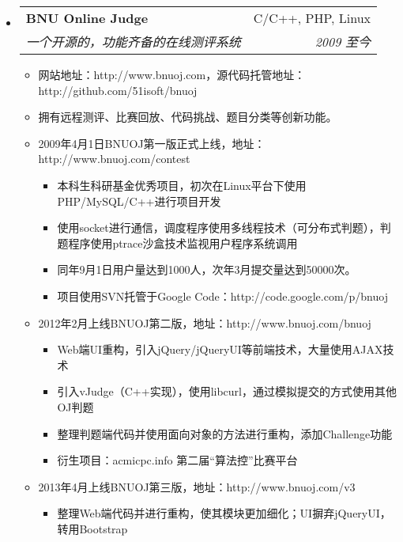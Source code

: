 \documentclass[letterpaper,11pt,UTF8,nofonts]{ctexart}
\makeatletter
\newcommand{\resitem}[1]{\item #1 \vspace{-2pt}}
\newcommand{\ressubheading}[4]{

\begin{tabular*}{6.5in}{l@{\cftdotfill{\cftsecdotsep}\extracolsep{\fill}}r}

		\textbf{#1} & #2 \\

		\textit{#3} & \textit{#4} \\

\end{tabular*}\vspace{-6pt}}
\makeatother
\begin{document}
\begin{itemize}

\item \ressubheading{BNU Online Judge}{C/C++, PHP, Linux}{一个开源的，功能齐备的在线测评系统}{2009 至今}

  \begin{itemize}

    \resitem{网站地址：http://www.bnuoj.com，源代码托管地址：http://github.com/51isoft/bnuoj}
    
    \resitem{拥有远程测评、比赛回放、代码挑战、题目分类等创新功能。}

    \resitem{2009年4月1日BNUOJ第一版正式上线，地址：http://www.bnuoj.com/contest}
    
    \begin{itemize}
    
    	\resitem{本科生科研基金优秀项目，初次在Linux平台下使用PHP/MySQL/C++进行项目开发}
    	
    	\resitem{使用socket进行通信，调度程序使用多线程技术（可分布式判题），判题程序使用ptrace沙盒技术监视用户程序系统调用}
    	
    	\resitem{同年9月1日用户量达到1000人，次年3月提交量达到50000次。}
    	
    	\resitem{项目使用SVN托管于Google Code：http://code.google.com/p/bnuoj}
    	
    \end{itemize}
    
    \resitem{2012年2月上线BNUOJ第二版，地址：http://www.bnuoj.com/bnuoj}
    
    \begin{itemize}
    
    	\resitem{Web端UI重构，引入jQuery/jQueryUI等前端技术，大量使用AJAX技术}
    	
    	\resitem{引入vJudge（C++实现），使用libcurl，通过模拟提交的方式使用其他OJ判题}
    	
    	\resitem{整理判题端代码并使用面向对象的方法进行重构，添加Challenge功能}
    	
    	\resitem{衍生项目：acmicpc.info 第二届“算法控”比赛平台}
    	
    \end{itemize}

    \resitem{2013年4月上线BNUOJ第三版，地址：http://www.bnuoj.com/v3}
    
    \begin{itemize}
    
    	\resitem{整理Web端代码并进行重构，使其模块更加细化；UI摒弃jQueryUI，转用Bootstrap}
    	

\end{itemize}
\end{itemize}
\end{itemize}
\end{document}
